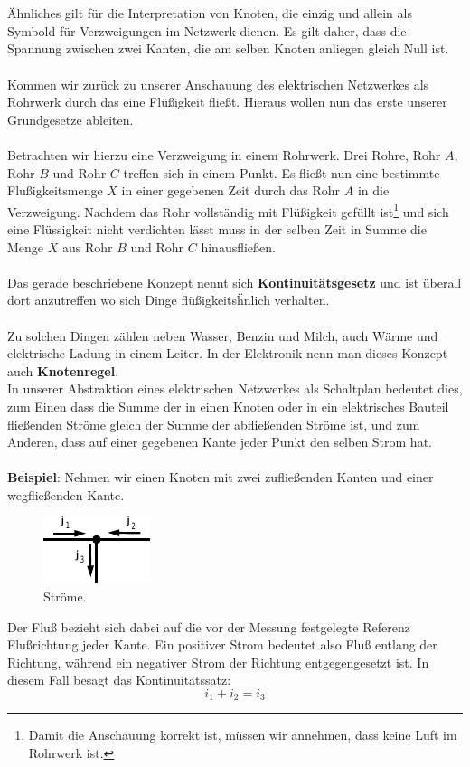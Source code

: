 \documentclass[11pt,a4paper,leqno]{report}
\numberwithin{equation}{chapter}
\begin{document}
\\
\\
\"Ahnliches gilt f\"ur die Interpretation von Knoten, die einzig und allein als Symbold f\"ur Verzweigungen im Netzwerk dienen. Es gilt daher, dass die Spannung zwischen zwei Kanten, die am selben Knoten anliegen gleich Null ist.\\
\\
Kommen wir zur\"uck zu unserer Anschauung des elektrischen Netzwerkes als Rohrwerk durch das eine Fl\"u\ss{}igkeit flie\ss{}t. Hieraus wollen nun das erste unserer Grundgesetze ableiten.
\\
\\
Betrachten wir hierzu eine Verzweigung in einem Rohrwerk. Drei Rohre, Rohr $A$, Rohr $B$ und Rohr $C$ treffen sich in einem Punkt. Es flie\ss{}t nun eine bestimmte Flu\ss{}igkeitsmenge $X$ in einer gegebenen Zeit durch das Rohr $A$ in die Verzweigung. Nachdem das Rohr vollst\"andig mit Fl\"u\ss{}igkeit gef\"ullt ist\footnote{Damit die Anschauung korrekt ist, m\"ussen wir annehmen, dass keine Luft im Rohrwerk ist.} und sich eine Fl\"ussigkeit nicht verdichten l\"asst muss in der selben Zeit in Summe die Menge $X$ aus Rohr $B$ und Rohr $C$ hinausflie\ss{}en.\\
\\
Das gerade beschriebene Konzept nennt sich \textbf{Kontinuit\"atsgesetz} und ist \"uberall dort anzutreffen wo sich Dinge fl\"u\ss{}igkeits\"hnlich verhalten.\\
\\
Zu solchen Dingen z\"ahlen neben Wasser, Benzin und Milch, auch W\"arme und elektrische Ladung in einem Leiter. In der Elektronik nenn man dieses Konzept auch \textbf{Knotenregel}.\\
In unserer Abstraktion eines elektrischen Netzwerkes als Schaltplan bedeutet dies, zum Einen dass die Summe der in einen Knoten oder in ein elektrisches Bauteil flie\ss{}enden Str\"ome gleich der Summe der abflie\ss{}enden Str\"ome ist, und zum Anderen, dass auf einer gegebenen Kante jeder Punkt den selben Strom hat.\\
\\
\textbf{Beispiel}: Nehmen wir einen Knoten mit zwei zuflie\ss{}enden Kanten und einer wegflie\ss{}enden Kante.
\begin{figure}[H]
	\begin{center}
		\includegraphics[scale=2]{flow.pdf}
		\caption{Str\"ome.}
	\end{center}
\end{figure}
\noindent
Der Flu\ss{} bezieht sich dabei auf die vor der Messung festgelegte Referenz Flu\ss{}richtung jeder Kante. Ein positiver Strom bedeutet also Flu\ss{} entlang der Richtung, w\"ahrend ein negativer Strom der Richtung entgegengesetzt ist. In diesem Fall besagt das Kontinuit\"atssatz:
\begin{equation}
i_1 + i_2 = i_3
\end{equation}
\end{document}
